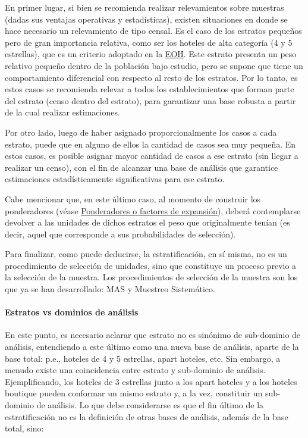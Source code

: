 \documentclass[
]{book}
\begin{document}
En primer lugar, si bien se recomienda realizar relevamientos sobre muestras (dadas sus ventajas operativas y estadísticas), existen situaciones en donde se hace necesario un relevamiento de tipo censal. Es el caso de los estratos pequeños pero de gran importancia relativa, como ser los hoteles de alta categoría (4 y 5 estrellas), que es un criterio adoptado en la \href{https://www.indec.gob.ar/ftp/cuadros/economia/eoh_aspectos_metodologicos.pdf}{EOH}. Este estrato presenta un peso relativo pequeño dentro de la población bajo estudio, pero se supone que tiene un comportamiento diferencial con respecto al resto de los estratos. Por lo tanto, es estos casos se recomienda relevar a todos los establecimientos que forman parte del estrato (censo dentro del estrato), para garantizar una base robusta a partir de la cual realizar estimaciones.

Por otro lado, luego de haber asignado proporcionalmente los casos a cada estrato, puede que en alguno de ellos la cantidad de casos sea muy pequeña. En estos casos, es posible asignar mayor cantidad de casos a ese estrato (sin llegar a realizar un censo), con el fin de alcanzar una base de análisis que garantice estimaciones estadísticamente significativas para ese estrato.

Cabe mencionar que, en este último caso, al momento de construir los ponderadores (véase \protect\hyperlink{ponderadores-o-factores-de-expansiuxf3n}{Ponderadores o factores de expansión}), deberá contemplarse devolver a las unidades de dichos estratos el peso que originalmente tenían (es decir, aquel que corresponde a sus probabilidades de selección).

Para finalizar, como puede deducirse, la estratificación, en sí misma, no es un procedimiento de selección de unidades, sino que constituye un proceso previo a la selección de la muestra. Los procedimientos de selección de la muestra son los que ya se han desarrollado: MAS y Muestreo Sistemático.

\hypertarget{estratos-vs-dominios-de-anuxe1lisis}{%
\paragraph{Estratos vs dominios de análisis}\label{estratos-vs-dominios-de-anuxe1lisis}}

En este punto, es necesario aclarar que estrato no es sinónimo de sub-dominio de análisis, entendiendo a este último como una nueva base de análisis, aparte de la base total: p.e., hoteles de 4 y 5 estrellas, apart hoteles, etc. Sin embargo, a menudo existe una coincidencia entre estrato y sub-dominio de análisis. Ejemplificando, los hoteles de 3 estrellas junto a los apart hoteles y a los hoteles boutique pueden conformar un mismo estrato y, a la vez, constituir un sub-dominio de análisis. Lo que debe considerarse es que el fin último de la estratificación no es la definición de otras bases de análisis, además de la base total, sino:
\end{document}
